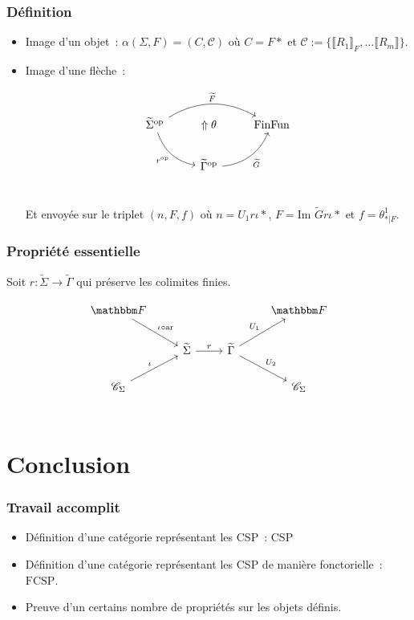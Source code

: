 \documentclass[12pt]{beamer}
\newcommand\arf{\text{ar}}
\newcommand\csp{\text{CSP}}
\renewcommand\C{\mathscr{C}}
\newcommand\ffun{\text{FinFun}}
\newcommand\im{\text{Im }}
\newcommand\sem[1]{\llbracket {#1} \rrbracket}
\newcommand{\cf}{\mathbb{F}}
\newcommand{\tsigma}{\widetilde{\Sigma}}
\newcommand{\tgamma}{\widetilde{\Gamma}}
\newcommand{\fcsp}{\text{FCSP}}
\newcommand{\op}{\text{op}}
\newcommand{\tf}{\widetilde{F}}
\newcommand{\tg}{\widetilde{G}}
\begin{document}
\begin{frame}
    \frametitle{Définition}

    \begin{itemize}[<+->]
        \item Image d'un objet~: $\alpha(\Sigma,F) = (C,\mathcal{C})$
            où $C=F\ast$ et $\mathcal{C} := \{\sem{R_1}_F,\dots\sem{R_m}\}$.

        \item Image d'une flèche~:

            \[\begin{tikzcd}[ampersand replacement=\&]
                \tsigma^\op\arrow[dr, bend right, swap, "r^\op"]
                           \arrow[rr, bend left, "\tf"]
                    \& \Uparrow\theta
                    \& \ffun \\
                \& \tgamma^\op\arrow[ur, bend right, swap, "\tg"] \\
            \end{tikzcd}\]

            Et envoyée sur le triplet $(n,F,f)$ où $n = U_1r\iota\ast$,
            $F = \im \tg r\iota\ast$ et $f = \theta^1_{\ast|F}$.
    \end{itemize}
\end{frame}

\begin{frame}
    \frametitle{Propriété essentielle}

    Soit $r:\tsigma\rightarrow\tgamma$ qui préserve les colimites finies.

    \[\begin{tikzcd}[ampersand replacement=\&]
        \cf\arrow[dr, "\iota\circ\arf"] \& \& \& \cf \\
        \& \tsigma\arrow[r, "r"] \& \tgamma\arrow[ur, "U_1"]\arrow[dr, "U_2"] \& \\
        \C_\Sigma\arrow[ur, "\iota"] \& \& \& \C_\Sigma \\
    \end{tikzcd}\]

\end{frame}

\section{Conclusion}

\begin{frame}
    \frametitle{Travail accomplit}

    \begin{itemize}[<+->]
        \item Définition d'une catégorie représentant les CSP~: $\csp$
        \item Définition d'une catégorie représentant les CSP de
            manière fonctorielle~: $\fcsp$.
        \item Preuve d'un certains nombre de propriétés sur les objets définis.
    \end{itemize}
\end{frame}
\end{document}
